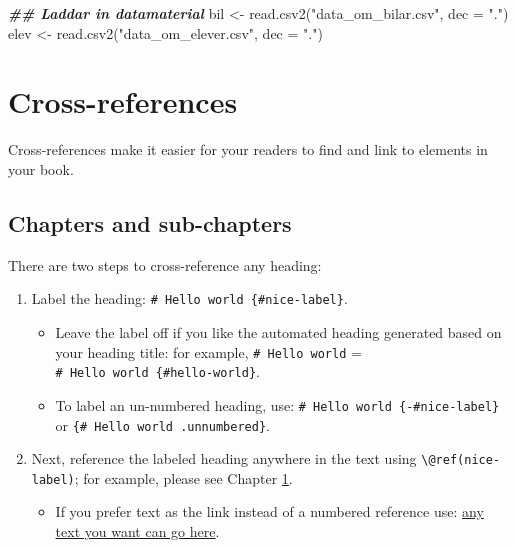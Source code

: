 \documentclass[
]{book}
\newenvironment{Shaded}{\begin{snugshade}}{\end{snugshade}}
\newcommand{\AttributeTok}[1]{\textcolor[rgb]{0.77,0.63,0.00}{#1}}
\newcommand{\DocumentationTok}[1]{\textcolor[rgb]{0.56,0.35,0.01}{\textbf{\textit{#1}}}}
\newcommand{\FunctionTok}[1]{\textcolor[rgb]{0.00,0.00,0.00}{#1}}
\newcommand{\NormalTok}[1]{#1}
\newcommand{\OtherTok}[1]{\textcolor[rgb]{0.56,0.35,0.01}{#1}}
\newcommand{\StringTok}[1]{\textcolor[rgb]{0.31,0.60,0.02}{#1}}
\providecommand{\tightlist}{%
  \setlength{\itemsep}{0pt}\setlength{\parskip}{0pt}}
\theoremstyle{definition}
\theoremstyle{definition}
\theoremstyle{definition}
\theoremstyle{definition}
\theoremstyle{remark}
\begin{document}
\begin{Shaded}
\begin{Highlighting}[]
\DocumentationTok{\#\# Laddar in datamaterial}
\NormalTok{bil }\OtherTok{\textless{}{-}} \FunctionTok{read.csv2}\NormalTok{(}\StringTok{"data\_om\_bilar.csv"}\NormalTok{, }\AttributeTok{dec =} \StringTok{"."}\NormalTok{)}
\NormalTok{elev }\OtherTok{\textless{}{-}} \FunctionTok{read.csv2}\NormalTok{(}\StringTok{"data\_om\_elever.csv"}\NormalTok{, }\AttributeTok{dec =} \StringTok{"."}\NormalTok{)}
\end{Highlighting}
\end{Shaded}

\hypertarget{cross}{%
\chapter{Cross-references}\label{cross}}

Cross-references make it easier for your readers to find and link to elements in your book.

\hypertarget{chapters-and-sub-chapters}{%
\section{Chapters and sub-chapters}\label{chapters-and-sub-chapters}}

There are two steps to cross-reference any heading:

\begin{enumerate}
\def\labelenumi{\arabic{enumi}.}
\tightlist
\item
  Label the heading: \texttt{\#\ Hello\ world\ \{\#nice-label\}}.

  \begin{itemize}
  \tightlist
  \item
    Leave the label off if you like the automated heading generated based on your heading title: for example, \texttt{\#\ Hello\ world} = \texttt{\#\ Hello\ world\ \{\#hello-world\}}.
  \item
    To label an un-numbered heading, use: \texttt{\#\ Hello\ world\ \{-\#nice-label\}} or \texttt{\{\#\ Hello\ world\ .unnumbered\}}.
  \end{itemize}
\item
  Next, reference the labeled heading anywhere in the text using \texttt{\textbackslash{}@ref(nice-label)}; for example, please see Chapter \ref{cross}.

  \begin{itemize}
  \tightlist
  \item
    If you prefer text as the link instead of a numbered reference use: \protect\hyperlink{cross}{any text you want can go here}.
  \end{itemize}
\end{enumerate}
\end{document}
